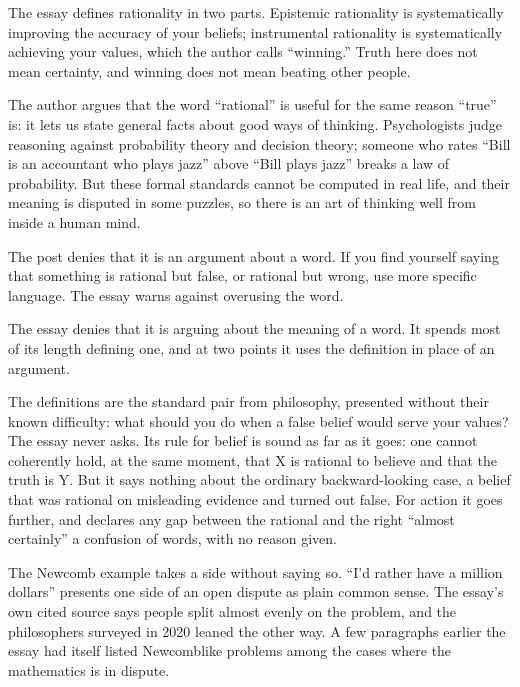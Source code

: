 \begin{afterword}
\summaryhead

The essay defines rationality in two parts. Epistemic rationality is systematically improving the accuracy of your beliefs; instrumental rationality is systematically achieving your values, which the author calls ``winning.'' Truth here does not mean certainty, and winning does not mean beating other people.

The author argues that the word ``rational'' is useful for the same reason ``true'' is: it lets us state general facts about good ways of thinking. Psychologists judge reasoning against probability theory and decision theory; someone who rates ``Bill is an accountant who plays jazz'' above ``Bill plays jazz'' breaks a law of probability. But these formal standards cannot be computed in real life, and their meaning is disputed in some puzzles, so there is an art of thinking well from inside a human mind.

The post denies that it is an argument about a word. If you find yourself saying that something is rational but false, or rational but wrong, use more specific language. The essay warns against overusing the word.

\responsehead

The essay denies that it is arguing about the meaning of a word. It spends most of its length defining one, and at two points it uses the definition in place of an argument.

The definitions are the standard pair from philosophy, presented without their known difficulty: what should you do when a false belief would serve your values? The essay never asks. Its rule for belief is sound as far as it goes: one cannot coherently hold, at the same moment, that X is rational to believe and that the truth is Y. But it says nothing about the ordinary backward-looking case, a belief that was rational on misleading evidence and turned out false. For action it goes further, and declares any gap between the rational and the right ``almost certainly'' a confusion of words, with no reason given.

The Newcomb example takes a side without saying so. ``I'd rather have a million dollars'' presents one side of an open dispute as plain common sense. The essay's own cited source says people split almost evenly on the problem, and the philosophers surveyed in 2020 leaned the other way. A few paragraphs earlier the essay had itself listed Newcomblike problems among the cases where the mathematics is in dispute.


\end{afterword}
